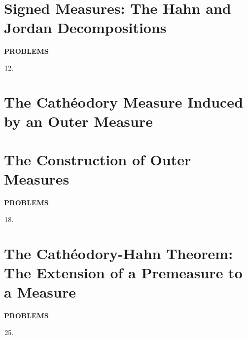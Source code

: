 \section{Signed Measures: The Hahn and Jordan Decompositions}
\begin{center}
	\textbf{PROBLEMS}
\end{center}
\begin{enumerate}
	\setcounter{enumi}{11}
	\item 
\end{enumerate}

\section{The Cath\'eodory Measure Induced by an Outer Measure}

\section{The Construction of Outer Measures}
\begin{center}
	\textbf{PROBLEMS}
\end{center}
\begin{enumerate}
	\setcounter{enumi}{17}
	\item
\end{enumerate}

\section{The Cath\'eodory-Hahn Theorem: The Extension of a Premeasure to a Measure}
\begin{center}
	\textbf{PROBLEMS}
\end{center}
\begin{enumerate}
	\setcounter{enumi}{24}
	\item
\end{enumerate}
